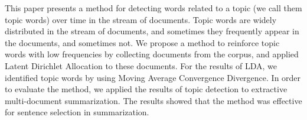 This paper presents a method for detecting words related to a topic (we call them topic words) over time in the stream of documents. Topic words are widely distributed in the stream of documents, and sometimes they frequently appear in the documents, and sometimes not. We propose a method to reinforce topic words with low frequencies by collecting documents from the corpus, and applied Latent Dirichlet Allocation to these documents. For the results of LDA, we identified topic words by using Moving Average Convergence Divergence. In order to evaluate the method, we applied the results of topic detection to extractive multi-document summarization. The results showed that the method was effective for sentence selection in summarization.
